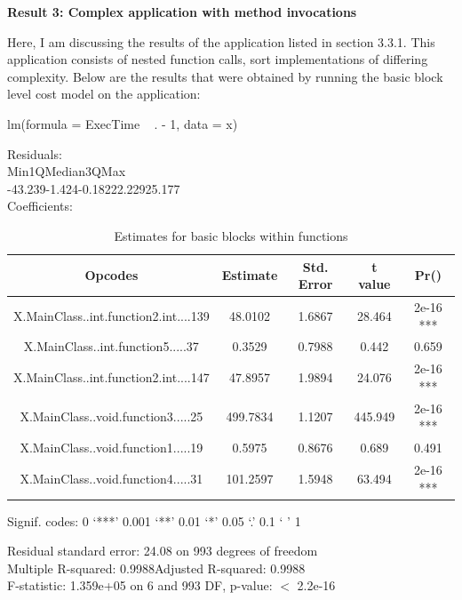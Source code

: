 \documentclass[11pt]{article}
\begin{document}
\textbf{Result 3: Complex application with method invocations}

Here, I am discussing the results of the application listed in section 3.3.1. This application consists of nested function calls, sort implementations of differing complexity. Below are the results that were obtained by running the basic block level cost model on the application:

lm(formula = ExecTime ~ . - 1, data = x)

Residuals:\\
Min\hspace{3.5em}1Q\hspace{3em}Median\hspace{3em}3Q\hspace{3em}Max \\
-43.239\hspace{2em}-1.424\hspace{2em}-0.182\hspace{2em}22.229\hspace{2em}25.177\\
Coefficients:
\begin{table}[h!]
\begin{center}
 \begin{tabular}{ |c|c|c|c|c| }
 \hline
 Opcodes&Estimate&Std. Error&t value&Pr()    \\
 \hline
X.MainClass..int.function2.int....139&48.0102&1.6867&28.464&2e-16 ***\\
X.MainClass..int.function5.....37&0.3529&0.7988&0.442&0.659\\    
X.MainClass..int.function2.int....147&47.8957&1.9894&24.076&2e-16 ***\\
X.MainClass..void.function3.....25&499.7834&1.1207&445.949&2e-16 ***\\
X.MainClass..void.function1.....19&0.5975&0.8676&0.689&0.491\\    
X.MainClass..void.function4.....31&101.2597&1.5948&63.494&2e-16 ***\\
\hline
 \end{tabular}
 \end{center}
 \caption{Estimates for basic blocks within functions}
 \label{Linear Regression results:6}
 \end{table}
 
Signif. codes:  0 ‘***’ 0.001 ‘**’ 0.01 ‘*’ 0.05 ‘.’ 0.1 ‘ ’ 1

Residual standard error: 24.08 on 993 degrees of freedom\\
Multiple R-squared:  0.9988\hspace{2em}Adjusted R-squared:  0.9988\\ 
F-statistic: 1.359e+05 on 6 and 993 DF,  p-value: $<$ 2.2e-16\\
\end{document}
